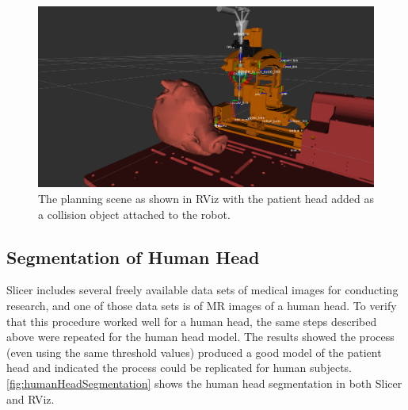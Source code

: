 \documentclass[12pt]{report}
\begin{document}
\begin{figure}[thpb]
	\centering
	\includegraphics[width=\textwidth]{images/segmentation_rviz.png}
    \caption{The planning scene as shown in RViz with the patient head added as a collision object attached to the robot.}
    \label{fig:patientHeadInPlanningScene}
\end{figure}

\subsection{Segmentation of Human Head}
Slicer includes several freely available data sets of medical images for conducting research, and one of those data sets is of MR images of a human head. To verify that this procedure worked well for a human head, the same steps described above were repeated for the human head model. The results showed the process (even using the same threshold values) produced a good model of the patient head and indicated the process could be replicated for human subjects. \autoref{fig:humanHeadSegmentation} shows the human head segmentation in both Slicer and RViz.
\end{document}
